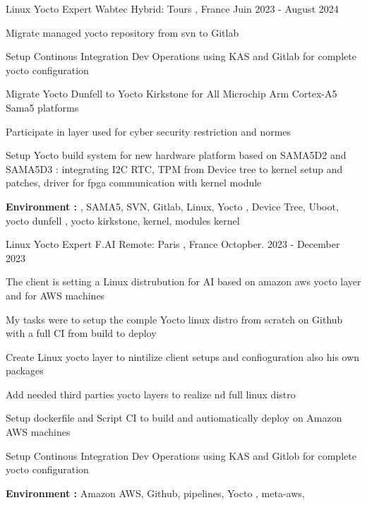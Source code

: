 \documentclass[11pt, a4paper]{awesome-cv} %
\begin{document}
\begin{cventries}
 \cventry
    {Linux Yocto Expert} %
    {Wabtec} %
    {Hybrid:  Tours , France} %
    {Juin 2023 - August 2024 } %
    { %
        \begin{cvitems}
            \item {Migrate managed yocto repository from svn to Gitlab }
            \item {Setup Continous Integration Dev Operations using KAS and Gitlab for complete yocto configuration}
            \item {Migrate Yocto Dunfell to Yocto Kirkstone for All Microchip Arm Cortex-A5 Sama5 platforms}
            \item {Participate in layer used for cyber security restriction and normes}
            \item {Setup Yocto build system for new hardware platform based on SAMA5D2 and SAMA5D3 : integrating I2C RTC, TPM from Device tree to kernel setup and patches, driver for fpga communication with kernel module}
            \item { \textbf{Environment :} ,  SAMA5, SVN, Gitlab, Linux, Yocto , Device Tree, Uboot, yocto dunfell , yocto kirkstone, kernel, modules kernel}
        \end{cvitems}
    }



 \cventry
    {Linux Yocto Expert} %
    {F.AI} %
    {Remote:  Paris , France} %
    {Octopber. 2023 - December 2023} %
    { %
        \begin{cvitems}
            \item {The client is setting a Linux distrubution for AI  based on amazon aws yocto layer and  for AWS machines }
            \item {My tasks  were to setup the comple Yocto linux distro  from scratch on Github with a full CI from build to deploy}
            \item {Create Linux yocto layer to nintilize client setups and confioguration also his own packages }
            \item {Add needed third parties yocto layers to realize nd full linux distro }
            \item {Setup dockerfile and Script CI to build and autiomatically deploy on Amazon AWS machines }
	  \item {Setup Continous Integration Dev Operations using KAS and Gitlob for complete yocto configuration}
            \item { \textbf{Environment :} Amazon AWS, Github, pipelines, Yocto , meta-aws, }
        \end{cvitems}
    }


\end{cventries}
\end{document}
